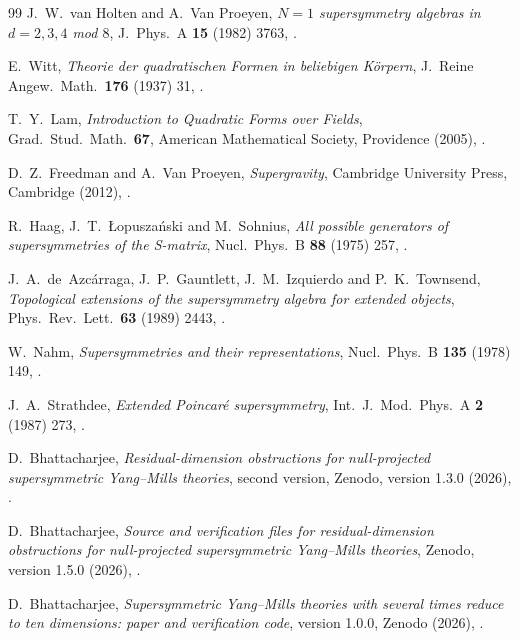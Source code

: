 \begin{thebibliography}{99}
J.~W.~van Holten and A.~Van Proeyen, \textit{$N=1$ supersymmetry algebras in $d=2,3,4$ mod $8$}, J.\ Phys.\ A \textbf{15} (1982) 3763, .

E.~Witt, \textit{Theorie der quadratischen Formen in beliebigen K\"orpern}, J.\ Reine Angew.\ Math.\ \textbf{176} (1937) 31, .

T.~Y.~Lam, \textit{Introduction to Quadratic Forms over Fields}, Grad.\ Stud.\ Math.\ \textbf{67}, American Mathematical Society, Providence (2005), .

D.~Z.~Freedman and A.~Van Proeyen, \textit{Supergravity}, Cambridge University Press, Cambridge (2012), .

R.~Haag, J.~T.~{\L}opusza\'nski and M.~Sohnius, \textit{All possible generators of supersymmetries of the S-matrix}, Nucl.\ Phys.\ B \textbf{88} (1975) 257, .

J.~A.~de~Azc\'arraga, J.~P.~Gauntlett, J.~M.~Izquierdo and P.~K.~Townsend, \textit{Topological extensions of the supersymmetry algebra for extended objects}, Phys.\ Rev.\ Lett.\ \textbf{63} (1989) 2443, .

W.~Nahm, \textit{Supersymmetries and their representations}, Nucl.\ Phys.\ B \textbf{135} (1978) 149, .

J.~A.~Strathdee, \textit{Extended Poincar\'e supersymmetry}, Int.\ J.\ Mod.\ Phys.\ A \textbf{2} (1987) 273, .

D.~Bhattacharjee, \emph{Residual-dimension obstructions for null-projected
supersymmetric Yang--Mills theories}, second version, Zenodo, version 1.3.0 (2026),
.

D.~Bhattacharjee, \emph{Source and verification files for residual-dimension
obstructions for null-projected supersymmetric Yang--Mills theories},
Zenodo, version 1.5.0 (2026), .

D.~Bhattacharjee, \textit{Supersymmetric Yang--Mills theories with several times reduce to ten dimensions: paper and verification code}, version 1.0.0, Zenodo (2026), .
\enlargethispage{7\baselineskip}

\end{thebibliography}
